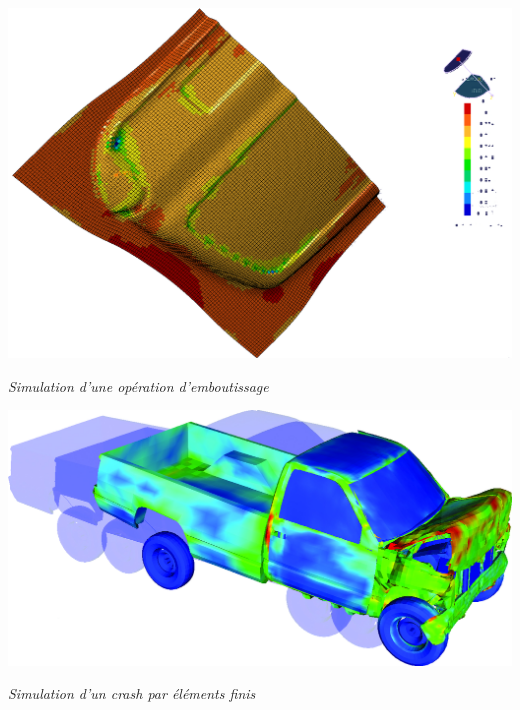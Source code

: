 \documentclass[11pt,oneside]{article}
\begin{document}
\begin{exemple}
\noindent\begin{minipage}[c]{.45\linewidth}
\begin{center}
\includegraphics[width=\textwidth]{png/simu_emboutissage}

\textit{Simulation d'une opération d'emboutissage}\cite{embouti}
\end{center}
\end{minipage} \hfill
\begin{minipage}[c]{.45\linewidth}
\begin{center}
\includegraphics[width=\textwidth]{png/crash}

\textit{Simulation d'un crash par éléments finis}\cite{ef}
\end{center}
\end{minipage}



\end{exemple}
\end{document}
